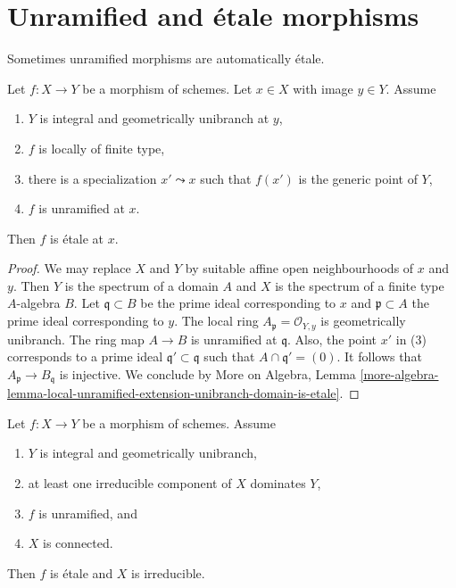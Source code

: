 \section{Unramified and \'etale morphisms}
\label{section-unramified-is-etale}

\noindent
Sometimes unramified morphisms are automatically \'etale.

\begin{lemma}
\label{lemma-unramified-dominant-unibranch-is-etale}
Let $f : X \to Y$ be a morphism of schemes. Let $x \in X$ with
image $y \in Y$. Assume
\begin{enumerate}
\item $Y$ is integral and geometrically unibranch at $y$,
\item $f$ is locally of finite type,
\item there is a specialization $x' \leadsto x$ such that $f(x')$
is the generic point of $Y$,
\item $f$ is unramified at $x$.
\end{enumerate}
Then $f$ is \'etale at $x$.
\end{lemma}

\begin{proof}
We may replace $X$ and $Y$ by suitable affine open neighbourhoods
of $x$ and $y$. Then $Y$ is the spectrum of a domain $A$ and
$X$ is the spectrum of a finite type $A$-algebra $B$.
Let $\mathfrak q \subset B$ be the prime ideal corresponding
to $x$ and $\mathfrak p \subset A$ the prime ideal corresponding to $y$.
The local ring $A_\mathfrak p = \mathcal{O}_{Y, y}$ is geometrically unibranch.
The ring map $A \to B$ is unramified at $\mathfrak q$.
Also, the point $x'$ in (3) corresponds to a prime ideal
$\mathfrak q' \subset \mathfrak q$ such that $A \cap \mathfrak q' = (0)$.
It follows that $A_\mathfrak p \to B_\mathfrak q$ is injective.
We conclude by
More on Algebra, Lemma
\ref{more-algebra-lemma-local-unramified-extension-unibranch-domain-is-etale}.
\end{proof}

\begin{lemma}
\label{lemma-global-unramified-dominant-unibranch-is-etale}
\begin{reference}
\cite[Expose I, Corollary 9.11]{SGA1}
\end{reference}
Let $f : X \to Y$ be a morphism of schemes. Assume
\begin{enumerate}
\item $Y$ is integral and geometrically unibranch,
\item at least one irreducible component of $X$ dominates $Y$,
\item $f$ is unramified, and
\item $X$ is connected.
\end{enumerate}
Then $f$ is \'etale and $X$ is irreducible.
\end{lemma}

